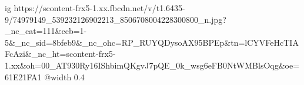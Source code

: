 
 
 
 
 

\ifcmt
  ig https://scontent-frx5-1.xx.fbcdn.net/v/t1.6435-9/74979149_539232126902213_8506708004228300800_n.jpg?_nc_cat=111&ccb=1-5&_nc_sid=8bfeb9&_nc_ohc=RP_RUYQDysoAX95BPEp&tn=lCYVFeHcTIAFcAzi&_nc_ht=scontent-frx5-1.xx&oh=00_AT930Ry16IShbimQKgvJ7pQE_0k_wsg6eFB0NtWMBlsOqg&oe=61E21FA1
  @width 0.4
\fi

